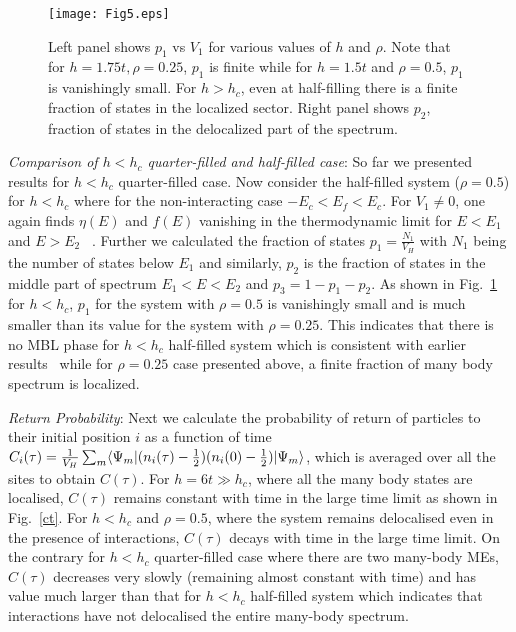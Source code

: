 \documentclass[prl,aps,twocolumn,floats,nofootinbib,showpacs]{revtex4}
\begin{document}
\begin{figure}[h!]
\begin{center}
\vskip-1cm
\hskip-0.5cm
\texttt{[image: Fig5.eps]}

\vskip-1cm
\caption{Left panel shows $p_{1}$ vs $V_1$ for various values of $h$ and $\rho$. Note that for $h=1.75t,\rho=0.25$, $p_1$ is finite while for $h=1.5t$ and $\rho=0.5$, $p_1$ is vanishingly small. For $h > h_c$, even at half-filling there is a finite fraction of states in the localized sector. Right panel shows $p_2$, fraction of states in the delocalized part of the spectrum. }
\label{frac}
\end{center}
\vskip-0.5cm
\end{figure}
\vskip0.1cm
{\it{Comparison of $h < h_c$ quarter-filled and half-filled case}}:
So far we presented results for $h < h_c$ quarter-filled case.
Now consider the half-filled system ($\rho=0.5$) for $h <h_c$ where for the non-interacting case $-E_c<E_f<E_c$. For $V_1\ne 0$, one again finds $\eta(E)$ and $f(E)$ vanishing in the thermodynamic limit for $E < E_1$ and $E> E_2$ ~\cite{supplemental2}. Further we calculated the fraction of states $p_1 = \frac{N_1}{V_H}$ with $N_1$ being the number of states below $E_1$ and similarly, $p_2$ is the fraction of states in the middle part of spectrum $E_1< E< E_2$ and $p_3=1-p_1-p_2$. As shown in Fig.~\ref{frac} for $h < h_c$, $p_1$ for the system with $\rho=0.5$ is vanishingly small and is much smaller than its value for the system with $\rho=0.25$. This indicates that there is no MBL phase for $h <h_c$ half-filled system which is consistent with earlier results~\cite{Subroto} while for $\rho=0.25$ case presented above, a finite fraction of many body spectrum is localized. %

{\it{Return Probability}}:
Next we calculate the probability of return of particles to their initial position $i$ as a function of time $C_i(\tau)=\frac{1}{V_H}\sum_m\langle \Psi_m|(n_i(\tau)-\frac{1}{2})(n_i(0)-\frac{1}{2})|\Psi_m\rangle$, which is averaged over all the sites to obtain $C(\tau)$. For $h=6t \gg h_c$, where all the many body states are localised, $C(\tau)$ remains constant with time in the large time limit as shown in Fig.~\ref{ct}. For $h<h_c$ and $\rho=0.5$, where the system remains delocalised even in the presence of interactions, $C(\tau)$ decays with time in the large time limit. On the contrary for $h <h_c$ quarter-filled case where there are two many-body MEs, $C(\tau)$ decreases very slowly (remaining almost constant with time) and has value much larger than that for $h < h_c$ half-filled system which indicates that interactions have not delocalised the entire many-body spectrum. 
\end{document}
